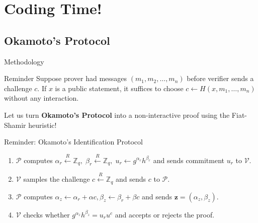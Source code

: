 \documentclass[xcolor={usenames,dvipsnames}]{beamer}
\begin{document}
    \section{Coding Time!}

    \subsection{Okamoto's Protocol}
    \begin{frame}{Methodology}
        \begin{block}{Reminder}
            Suppose prover had messages $(m_1,m_2,\dots,m_n)$ before verifier sends a challenge $c$. If $x$ is a public statement, it suffices to choose $c \gets H(x,m_1,\dots,m_n)$ without any interaction.
        \end{block}

        Let us turn \textbf{Okamoto's Protocol} into a non-interactive proof using the Fiat-Shamir heuristic!

        \begin{block}{Reminder: Okamoto's Identification Protocol}
            \begin{enumerate}
                \item $\mathcal{P}$ computes $\alpha_r \xleftarrow{R} \mathbb{Z}_q, \; \beta_r \xleftarrow{R} \mathbb{Z}_q, \; u_r \gets g^{\alpha_r}h^{\beta_r}$ and sends commitment $u_r$ to $\mathcal{V}$.
                \item $\mathcal{V}$ samples the challenge $c \xleftarrow{R} \mathbb{Z}_q$ and sends $c$ to $\mathcal{P}$.
                \item $\mathcal{P}$ computes $\alpha_z \gets \alpha_r + \alpha c, \beta_z \gets \beta_r + \beta c$ and sends $\mathbf{z} = (\alpha_z,\beta_z)$.
                \item $\mathcal{V}$ checks whether $g^{\alpha_z}h^{\beta_z} = u_r u^c$ and accepts or rejects the proof.
            \end{enumerate}
        \end{block}
    \end{frame}
\end{document}
